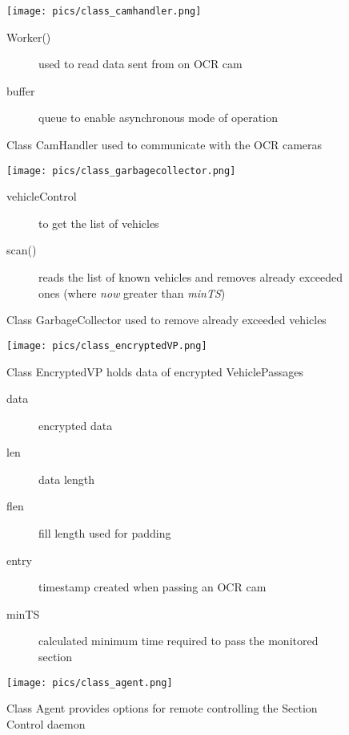 \documentclass[oneside,bachelor,etd]{BYUPhys}
\begin{document}
\begin{figure}[p]
    \centerline{\texttt{[image: pics/class\_camhandler.png]}}
    \caption[Class CamHandler]{\label{fig:Class CamHandler}
	Class CamHandler used to communicate with the OCR cameras}
	
	\begin{description}
	\item[Worker()] used to read data sent from on OCR cam
	\item[buffer] queue to enable asynchronous mode of operation
	\end{description}
\end{figure}

\begin{figure}[p]
    \centerline{\texttt{[image: pics/class\_garbagecollector.png]}}
    \caption[Class GarbageCollector]{\label{fig:Class GarbageCollector}
	Class GarbageCollector used to remove already exceeded vehicles}
	
	\begin{description}
	\item[vehicleControl] to get the list of vehicles
	\item[scan()] reads the list of known vehicles and removes already exceeded ones
	(where \textit{now} greater than \textit{minTS})
	\end{description}
\end{figure}

\begin{figure}[p]
    \centerline{\texttt{[image: pics/class\_encryptedVP.png]}}
    \caption[Class EncryptedVP]{\label{fig:Class EncryptedVP}
	Class EncryptedVP holds data of encrypted VehiclePassages}
	
	\begin{description}
	\item[data] encrypted data
	\item[len] data length
	\item[flen] fill length used for padding
	\item[entry] timestamp created when passing an OCR cam
	\item[minTS] calculated minimum time required to pass the monitored section
	\end{description}

    \centerline{\texttt{[image: pics/class\_agent.png]}}
    \caption[Class Agent]{\label{fig:Class Agent}
	Class Agent provides options for remote controlling the Section Control daemon}
\end{figure}
\end{document}
